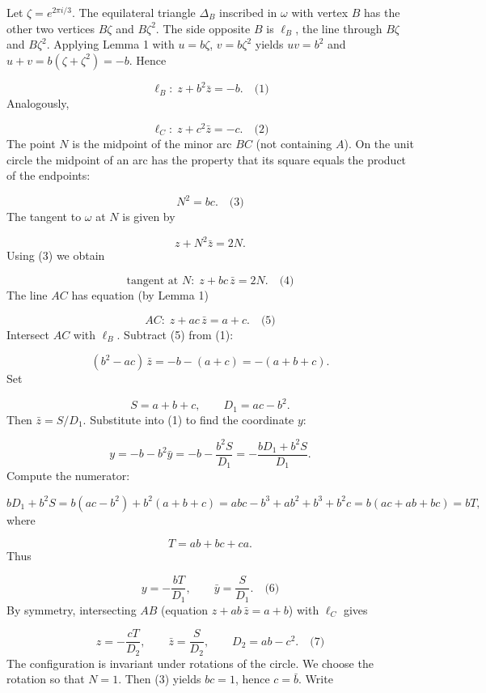 \smallskip
{}
Let \(\zeta = e^{2\pi i/3}\). The equilateral triangle \(\Delta_B\) inscribed in \(\omega\) with vertex \(B\) has the other two vertices \(B\zeta\) and \(B\zeta^2\). The side opposite \(B\) is \(\ell_B\), the line through \(B\zeta\) and \(B\zeta^2\). Applying Lemma 1 with \(u = b\zeta\), \(v = b\zeta^2\) yields \(uv = b^2\) and \(u+v = b(\zeta+\zeta^2) = -b\). Hence\par
\[
\ell_B:\; z + b^2\bar{z} = -b. \quad\text{(1)}
\]
Analogously,\par
\[
\ell_C:\; z + c^2\bar{z} = -c. \quad\text{(2)}
\]
The point \(N\) is the midpoint of the minor arc \(BC\) (not containing \(A\)). On the unit circle the midpoint of an arc has the property that its square equals the product of the endpoints:\par
\[
N^2 = bc. \quad\text{(3)}
\]
The tangent to \(\omega\) at \(N\) is given by\par
\[
z + N^2\bar{z} = 2N.
\]
Using (3) we obtain\par
\[
\text{tangent at }N:\; z + bc\,\bar{z} = 2N. \quad\text{(4)}
\]
\smallskip
{}
The line \(AC\) has equation (by Lemma 1)\par
\[
AC:\; z + ac\,\bar{z} = a + c. \quad\text{(5)}
\]
Intersect \(AC\) with \(\ell_B\). Subtract (5) from (1):\par
\[
(b^2 - ac)\,\bar{z} = -b - (a+c) = -(a+b+c).
\]
Set\par
\[
S = a+b+c,\qquad D_1 = ac - b^2.
\]
Then \(\bar{z} = S/D_1\). Substitute into (1) to find the coordinate \(y\):\par
\[
y = -b - b^2\bar{y} = -b - \frac{b^2 S}{D_1} = -\frac{b D_1 + b^2 S}{D_1}.
\]
Compute the numerator:\par
\[
b D_1 + b^2 S = b(ac - b^2) + b^2(a+b+c) = abc - b^3 + ab^2 + b^3 + b^2c = b(ac + ab + bc) = b T,
\]
where\par
\[
T = ab + bc + ca.
\]
Thus\par
\[
y = -\frac{b T}{D_1},\qquad \bar{y} = \frac{S}{D_1}. \quad\text{(6)}
\]
By symmetry, intersecting \(AB\) (equation \(z + ab\,\bar{z} = a+b\)) with \(\ell_C\) gives\par
\[
z = -\frac{c T}{D_2},\qquad \bar{z} = \frac{S}{D_2},\qquad D_2 = ab - c^2. \quad\text{(7)}
\]
\smallskip
{}
The configuration is invariant under rotations of the circle. We choose the rotation so that \(N = 1\). Then (3) yields \(bc = 1\), hence \(c = \bar{b}\). Write\par
